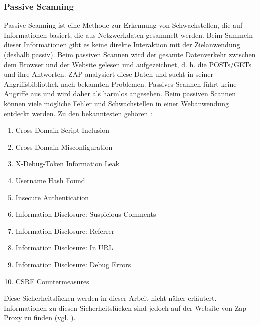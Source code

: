 \subsubsection{Passive Scanning}

Passive Scanning ist eine Methode zur Erkennung von Schwachstellen, die auf
Informationen basiert, die aus Netzwerkdaten gesammelt werden. Beim Sammeln
dieser Informationen gibt es keine direkte Interaktion mit der Zielanwendung
(deshalb passiv). Beim passiven Scannen wird der gesamte Datenverkehr zwischen
dem Browser und der Website gelesen und aufgezeichnet, d. h. die POSTs/GETs
und ihre Antworten. ZAP analysiert diese Daten und sucht in seiner
Angriffsbibliothek nach bekannten Problemen. Passives Scannen führt keine
Angriffe aus und wird daher als harmlos angesehen. Beim passiven Scannen
können viele mögliche Fehler und Schwachstellen in einer Webanwendung
entdeckt werden.  Zu den bekanntesten gehören :

\begin{enumerate}
    \item Cross Domain Script Inclusion
    \item Cross Domain Misconfiguration
    \item X-Debug-Token Information Leak
    \item Username Hash Found
    \item Insecure Authentication
    \item Information Disclosure: Suspicious Comments
    \item Information Disclosure: Referrer
    \item Information Disclosure: In URL
    \item Information Disclosure: Debug Errors
    \item CSRF Countermeasures
\end{enumerate}

Diese Sicherheitslücken werden in dieser Arbeit nicht näher erläutert.
Informationen zu diesen Sicherheitslücken sind jedoch auf der Website von Zap Proxy
zu finden (vgl. \cite{passiv}).
